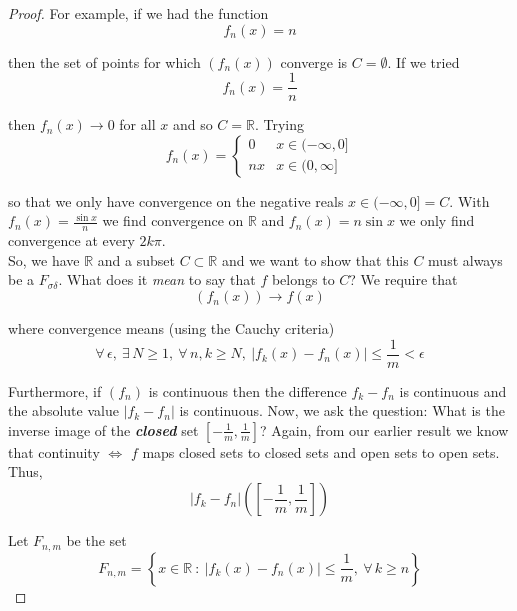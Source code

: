 \documentclass[12pt]{article}
\newlength\tindent
\renewcommand{\indent}{\hspace*{\tindent}}
\newcommand{\R}{\mathbb R}
\begin{document}
\begin{proof} For example, if we had the function
\begin{equation*}
	f_n(x) = n
\end{equation*}

then the set of points for which $(f_n(x))$ converge is $C = \emptyset$. If we tried
\begin{equation*}
	f_n(x) = \frac{1}{n}
\end{equation*}

then $f_n(x)\to 0$ for all $x$ and so $C = \R$. Trying
\begin{equation*}
	f_n(x) = 
	\begin{cases}
		0 & x \in (-\infty, 0] \\
		nx & x \in (0, \infty]
	\end{cases}
\end{equation*}

so that we only have convergence on the negative reals $x \in (-\infty, 0] = C$. With $f_n(x) = \frac{\sin x}{n}$ we find convergence on $\R$ and $f_n(x) = n\sin x$ we only find convergence at every $2k\pi$. \\

\indent So, we have $\R$ and a subset $C \subset \R$ and we want to show that this $C$ must always be a $F_{\sigma\delta}$. What does it {\em mean} to say that $f$ belongs to $C$? We require that
\begin{equation*}
	(f_n(x)) \to f(x)
\end{equation*}

where convergence means (using the Cauchy criteria)
\begin{equation*}
	\forall\,\epsilon,~\exists\,N\geq 1,~\forall\,n,k \geq N,~ |f_k(x) - f_n(x)| \leq \frac{1}{m} < \epsilon
\end{equation*}

\indent Furthermore, if $(f_n)$ is continuous then the difference $f_k - f_n$ is continuous and the absolute value $|f_k - f_n|$ is continuous. Now, we ask the question: What is the inverse image of the {\bf \em closed} set $\left[-\frac{1}{m}, \frac{1}{m}\right]$? Again, from our earlier result we know that continuity $\iff$ $f$ maps closed sets to closed sets and open sets to open sets. Thus,
\begin{equation*}
	|f_k - f_n|\left( \left[-\frac{1}{m}, \frac{1}{m}\right] \right)
\end{equation*}

Let $F_{n,m}$ be the set
\begin{equation*}
	F_{n,m} = \left\{ x \in \R ~:~ |f_k(x) - f_n(x)| \leq \frac{1}{m},~ \forall\,k \geq n \right\}
\end{equation*}


\end{proof}
\end{document}
